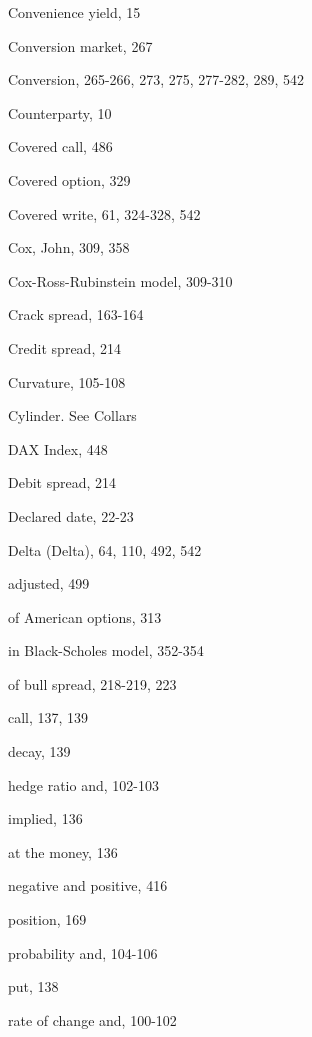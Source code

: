 \noindent Convenience yield, 15\par
\noindent Conversion market, 267\par
\noindent Conversion, 265-266, 273, 275, 277-282, 289, 542\par
\noindent Counterparty, 10\par
\noindent Covered call, 486\par
\noindent Covered option, 329\par
\noindent Covered write, 61, 324-328, 542\par
\noindent Cox, John, 309, 358\par
\noindent Cox-Ross-Rubinstein model, 309-310\par
\noindent Crack spread, 163-164\par
\noindent Credit spread, 214\par
\noindent Curvature, 105-108\par
\noindent Cylinder. See Collars\par
\noindent DAX Index, 448\par
\noindent Debit spread, 214\par
\noindent Declared date, 22-23\par
\noindent Delta (Delta), 64, 110, 492, 542\par
\noindent adjusted, 499\par
\noindent of American options, 313\par
\noindent in Black-Scholes model, 352-354\par
\noindent of bull spread, 218-219, 223\par
\noindent call, 137, 139\par
\noindent decay, 139\par
\noindent hedge ratio and, 102-103\par
\noindent implied, 136\par
\noindent at the money, 136\par
\noindent negative and positive, 416\par
\noindent position, 169\par
\noindent probability and, 104-106\par
\noindent put, 138\par
\noindent rate of change and, 100-102\par

